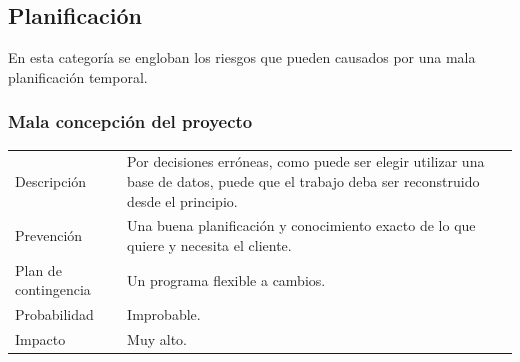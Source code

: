 \subsection{Planificaci\'{o}n}
En esta categor\'{i}a se engloban los riesgos que pueden causados por una mala planificaci\'{o}n 
temporal.
\subsubsection{Mala concepci\'{o}n del proyecto}
\begin{table}[H]
    \begin{center}
       \begin{tabular}{l p{8cm}}
           Descripci\'{o}n                 & Por decisiones erróneas, como puede ser elegir 
           utilizar una
           base de datos, puede que el trabajo deba ser reconstruido desde el principio. \\
           Prevenci\'{o}n                  & Una buena planificación y conocimiento exacto de lo 
           que quiere y necesita el cliente. 
           									  \\ 
           Plan de contingencia            & Un programa flexible a cambios. \\
           Probabilidad                    & Improbable. \\
           Impacto                         & Muy alto. \\
        \end{tabular}
    \end{center}
    
\end{table}
